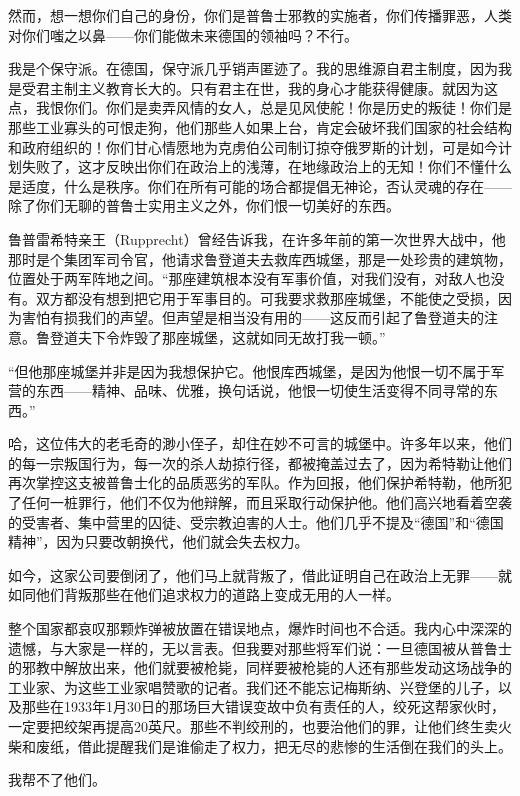 \documentclass[UTF8]{ctexart}
\begin{document}
然而，想一想你们自己的身份，你们是普鲁士邪教的实施者，你们传播罪恶，人类对你们嗤之以鼻——你们能做未来德国的领袖吗？不行。

我是个保守派。在德国，保守派几乎销声匿迹了。我的思维源自君主制度，因为我是受君主制主义教育长大的。只有君主在世，我的身心才能获得健康。就因为这点，我恨你们。你们是卖弄风情的女人，总是见风使舵！你是历史的叛徒！你们是那些工业寡头的可恨走狗，他们那些人如果上台，肯定会破坏我们国家的社会结构和政府组织的！你们甘心情愿地为克虏伯公司制订掠夺俄罗斯的计划，可是如今计划失败了，这才反映出你们在政治上的浅薄，在地缘政治上的无知！你们不懂什么是适度，什么是秩序。你们在所有可能的场合都提倡无神论，否认灵魂的存在——除了你们无聊的普鲁士实用主义之外，你们恨一切美好的东西。

鲁普雷希特亲王（Rupprecht）曾经告诉我，在许多年前的第一次世界大战中，他那时是个集团军司令官，他请求鲁登道夫去救库西城堡，那是一处珍贵的建筑物，位置处于两军阵地之间。“那座建筑根本没有军事价值，对我们没有，对敌人也没有。双方都没有想到把它用于军事目的。可我要求救那座城堡，不能使之受损，因为害怕有损我们的声望。但声望是相当没有用的——这反而引起了鲁登道夫的注意。鲁登道夫下令炸毁了那座城堡，这就如同无故打我一顿。”

“但他那座城堡并非是因为我想保护它。他恨库西城堡，是因为他恨一切不属于军营的东西——精神、品味、优雅，换句话说，他恨一切使生活变得不同寻常的东西。”

哈，这位伟大的老毛奇的渺小侄子，却住在妙不可言的城堡中。许多年以来，他们的每一宗叛国行为，每一次的杀人劫掠行径，都被掩盖过去了，因为希特勒让他们再次掌控这支被普鲁士化的品质恶劣的军队。作为回报，他们保护希特勒，他所犯了任何一桩罪行，他们不仅为他辩解，而且采取行动保护他。他们高兴地看着空袭的受害者、集中营里的囚徒、受宗教迫害的人士。他们几乎不提及“德国”和“德国精神”，因为只要改朝换代，他们就会失去权力。

如今，这家公司要倒闭了，他们马上就背叛了，借此证明自己在政治上无罪——就如同他们背叛那些在他们追求权力的道路上变成无用的人一样。

整个国家都哀叹那颗炸弹被放置在错误地点，爆炸时间也不合适。我内心中深深的遗憾，与大家是一样的，无以言表。但我要对那些将军们说：一旦德国被从普鲁士的邪教中解放出来，他们就要被枪毙，同样要被枪毙的人还有那些发动这场战争的工业家、为这些工业家唱赞歌的记者。我们还不能忘记梅斯纳、兴登堡的儿子，以及那些在1933年1月30日的那场巨大错误变故中负有责任的人，绞死这帮家伙时，一定要把绞架再提高20英尺。那些不判绞刑的，也要治他们的罪，让他们终生卖火柴和废纸，借此提醒我们是谁偷走了权力，把无尽的悲惨的生活倒在我们的头上。

我帮不了他们。
\end{document}
